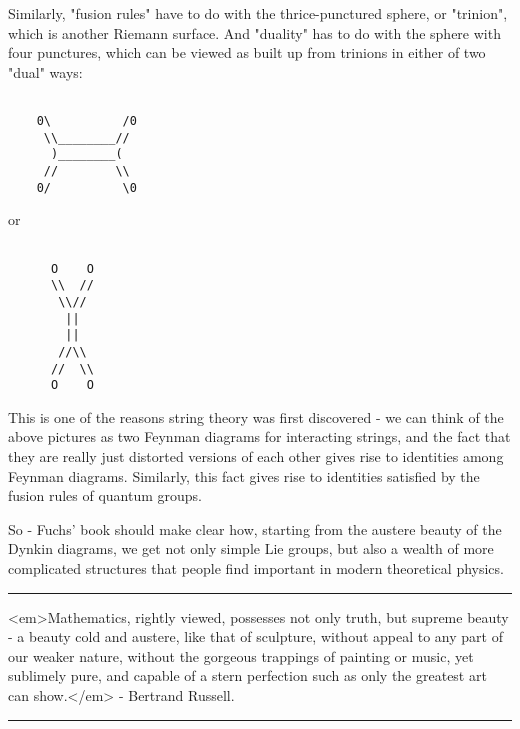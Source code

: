 Similarly, "fusion rules" have to do with the thrice-punctured sphere,
or "trinion", which is another Riemann surface.  And "duality" has
to do with the sphere with four punctures, which can be viewed as
built up from trinions in either of two "dual" ways:


\begin{verbatim}

    0\          /0
     \\________//
      )________(
     //        \\
    0/          \0
\end{verbatim}
    

or


\begin{verbatim}

      O    O
      \\  //
       \\//
        ||                 
        ||
       //\\
      //  \\
      O    O
\end{verbatim}
    

This is one of the reasons string theory was first discovered -
we can think of the above pictures as two Feynman diagrams for
interacting strings, and the fact that they are really just distorted
versions of each other gives rise to identities among Feynman diagrams.
Similarly, this fact gives rise to identities satisfied by the fusion
rules of quantum groups.

So - Fuchs' book should make clear how, starting from the austere
beauty of the Dynkin diagrams, we get not only simple Lie groups, but
also a wealth of more complicated structures that people find important
in modern theoretical physics.  

\par\noindent\rule{\textwidth}{0.4pt}
<em>Mathematics, rightly viewed, possesses not only truth, but supreme 
beauty - a beauty cold and austere, like that of sculpture, without appeal 
to any part of our weaker nature, without the gorgeous trappings of painting 
or music, yet sublimely pure, and capable of a stern perfection such as 
only the greatest art can show.</em> - Bertrand Russell.

\par\noindent\rule{\textwidth}{0.4pt}

